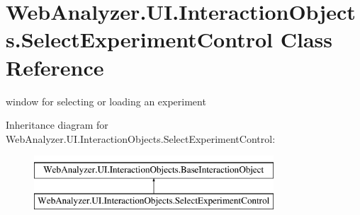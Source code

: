 \hypertarget{class_web_analyzer_1_1_u_i_1_1_interaction_objects_1_1_select_experiment_control}{}\section{Web\+Analyzer.\+U\+I.\+Interaction\+Objects.\+Select\+Experiment\+Control Class Reference}
\label{class_web_analyzer_1_1_u_i_1_1_interaction_objects_1_1_select_experiment_control}


window for selecting or loading an experiment  


Inheritance diagram for Web\+Analyzer.\+U\+I.\+Interaction\+Objects.\+Select\+Experiment\+Control\+:\begin{figure}[H]
\begin{center}
\leavevmode
\includegraphics[height=2.000000cm]{class_web_analyzer_1_1_u_i_1_1_interaction_objects_1_1_select_experiment_control}
\end{center}
\end{figure}
